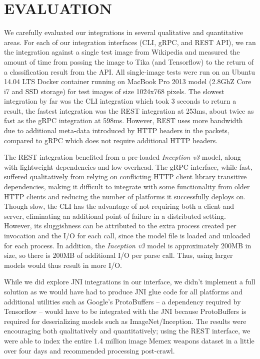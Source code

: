 \section {EVALUATION} \label{sec:evaluation}

We carefully evaluated our integrations in several qualitative and quantitative areas. For each of our integration interfaces (CLI, gRPC, and REST API), we ran the integration against a single test image from Wikipedia and measured the amount of time from passing the image to Tika (and Tensorflow) to the return of a classification result from the API. All single-image tests were run on an Ubuntu 14.04 LTS Docker container running on MacBook Pro 2013 model (2.8GhZ Core i7 and SSD storage) for test images of size 1024x768 pixels. The slowest integration by far was the CLI integration which took 3 seconds to return a result, the fastest integration was the REST integration at 253ms, about twice as fast as the gRPC integration at 598ms. However, REST uses more bandwidth due to additional meta-data introduced by HTTP headers in the packets, compared to gRPC which does not require additional HTTP headers.

The REST integration benefited from a pre-loaded \textit{Inception v3} model, along with lightweight dependencies and low overhead. The gRPC interface, while fast, suffered qualitatively from relying on conflicting HTTP client library transitive dependencies, making it difficult to integrate with some functionality from older HTTP clients and reducing the number of platforms it successfully deploys on. Though slow, the CLI has the advantage of not requiring both a client and server, eliminating an additional point of failure in a distributed setting. However, its sluggishness can be attributed to the extra process created per invocation and the I/O for each call, since the model file is loaded and unloaded for each process. In addition, the \textit{Inception v3} model is approximately 200MB in size, so there is 200MB of additional I/O per parse call. Thus, using larger models would thus result in more I/O.

While we did explore JNI integrations in our interface, we didn't implement a full solution as we would have had to produce JNI glue code for all platforms and additional utilities such as Google's ProtoBuffers -- a dependency required by Tensorflow -- would have to be integrated with the JNI because ProtoBuffers is required for deserializing models such as ImageNet/Inception\cite{javacpp-240}. The results  were encouraging both qualitatively and quantitatively; using the REST interface, we were able to index the entire 1.4 million image Memex weapons dataset in a little over four days and recommended processing post-crawl. 

